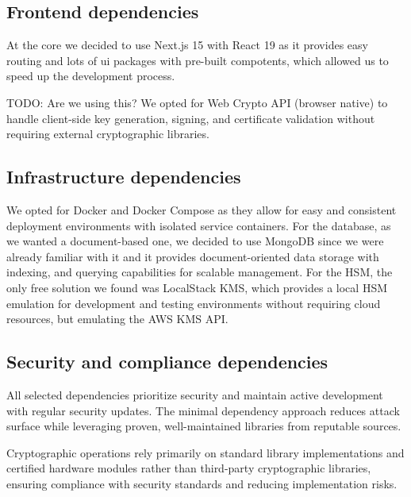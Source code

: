 \subsection{Frontend dependencies}

At the core we decided to use Next.js 15 with React 19 as it provides easy routing and
lots of ui packages with pre-built compotents, which allowed us to speed up the development process.

{\color{red}TODO: Are we using this?}
We opted for Web Crypto API (browser native) to handle 
client-side key generation, signing, and certificate validation without requiring 
external cryptographic libraries.

\subsection{Infrastructure dependencies}

We opted for Docker and Docker Compose as they allow for easy and consistent deployment 
environments with isolated service containers. For the database, as we wanted a document-based one,
we decided to use MongoDB since we were already familiar with it and it provides document-oriented 
data storage with indexing, and querying capabilities for scalable management.
For the HSM, the only free solution we found was LocalStack KMS, which provides a local HSM emulation
for development and testing environments without requiring cloud resources, but emulating the AWS KMS API.

\subsection{Security and compliance dependencies}

All selected dependencies prioritize security and maintain active development 
with regular security updates. The minimal dependency approach reduces attack 
surface while leveraging proven, well-maintained libraries from reputable sources. 

Cryptographic operations rely primarily on standard library implementations 
and certified hardware modules rather than third-party cryptographic libraries, 
ensuring compliance with security standards and reducing implementation risks.